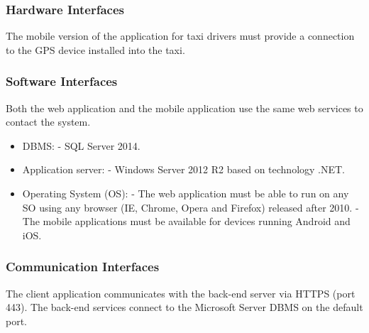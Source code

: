 \subsubsection{Hardware Interfaces}
	The mobile version of the application for taxi drivers must provide a connection to the GPS device installed into the taxi.
	
\subsubsection{Software Interfaces}
	Both the web application and the mobile application use the same web services to contact the system.
	\begin{itemize}
		\item DBMS: \newline
		- SQL Server 2014.
		\item Application server: \newline
		- Windows Server 2012 R2 based on technology .NET.
		\item Operating System (OS): \newline
		- The web application must be able to run on any SO using any browser (IE, Chrome, Opera and Firefox) released after 2010. \newline
		- The mobile applications must be available for devices running Android and iOS.
	\end{itemize}
	
\subsubsection{Communication Interfaces}
	The client application communicates with the back-end server via HTTPS (port 443).
	The back-end services connect to the Microsoft Server DBMS on the default port.